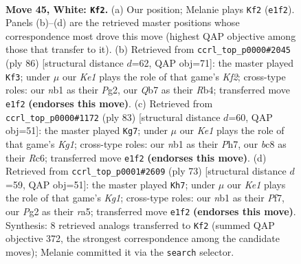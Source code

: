 \documentclass[11pt]{article}
\begin{document}
\clearpage

\begin{figure}[p]\centering
\begin{subfigure}{0.46\textwidth}\centering
\resizebox{\linewidth}{!}{%
\newchessgame
\chessboard[
  setfen={2b3k1/1Q3p1p/6p1/4Pp2/B4P2/7N/P5PP/1nr1K3 w - - 1 45},
  showmover=false,
  pgfstyle=straightmove, color=movearrow, markmove={e1-f2}
]}
\caption{}
\end{subfigure}\hfill
\begin{subfigure}{0.46\textwidth}\centering
\resizebox{\linewidth}{!}{%
\newchessgame
\chessboard[
  setfen={8/5ppk/3Np2p/4P3/1R2P3/8/b2r1KPP/8 w - - 6 44},
  showmover=false,
  pgfstyle=straightmove, color=movearrow, markmove={f2-f3}
]}
\caption{}
\end{subfigure}
\\[4pt]
\begin{subfigure}{0.46\textwidth}\centering
\resizebox{\linewidth}{!}{%
\newchessgame
\chessboard[
  setfen={3R2k1/7p/2rN2p1/p1n5/P1p3P1/4B2P/5P2/b4K2 b - - 6 42},
  showmover=false,
  pgfstyle=straightmove, color=movearrow, markmove={g8-g7}
]}
\caption{}
\end{subfigure}\hfill
\begin{subfigure}{0.46\textwidth}\centering
\resizebox{\linewidth}{!}{%
\newchessgame
\chessboard[
  setfen={3R2k1/5pp1/7p/R3P3/1b5P/pP2B1P1/5PK1/1q6 b - - 4 37},
  showmover=false,
  pgfstyle=straightmove, color=movearrow, markmove={g8-h7}
]}
\caption{}
\end{subfigure}
\caption{\textbf{Move 45, White: \texttt{Kf2}.} (a) Our position; Melanie plays \texttt{Kf2} (\texttt{e1f2}). Panels (b)--(d) are the retrieved master positions whose correspondence most drove this move (highest QAP objective among those that transfer to it). (b) Retrieved from \texttt{ccrl\_top\_p0000\#2045} (ply 86) [structural distance $d$=62, QAP obj=71]: the master played \texttt{Kf3}; under $\mu$ our \emph{Ke1} plays the role of that game's \emph{Kf2}; cross-type roles: our \emph{n}b1 as their \emph{P}g2, our \emph{Q}b7 as their \emph{R}b4; transferred move \texttt{e1f2} \textbf{(endorses this move)}. (c) Retrieved from \texttt{ccrl\_top\_p0000\#1172} (ply 83) [structural distance $d$=60, QAP obj=51]: the master played \texttt{Kg7}; under $\mu$ our \emph{Ke1} plays the role of that game's \emph{Kg1}; cross-type roles: our \emph{n}b1 as their \emph{P}h7, our \emph{b}c8 as their \emph{R}c6; transferred move \texttt{e1f2} \textbf{(endorses this move)}. (d) Retrieved from \texttt{ccrl\_top\_p0001\#2609} (ply 73) [structural distance $d$=59, QAP obj=51]: the master played \texttt{Kh7}; under $\mu$ our \emph{Ke1} plays the role of that game's \emph{Kg1}; cross-type roles: our \emph{n}b1 as their \emph{P}f7, our \emph{P}g2 as their \emph{r}a5; transferred move \texttt{e1f2} \textbf{(endorses this move)}. Synthesis: 8 retrieved analogs transferred to \texttt{Kf2} (summed QAP objective 372, the strongest correspondence among the candidate moves); Melanie committed it via the \texttt{search} selector.}
\label{fig:thought-m88}
\end{figure}
\end{document}
